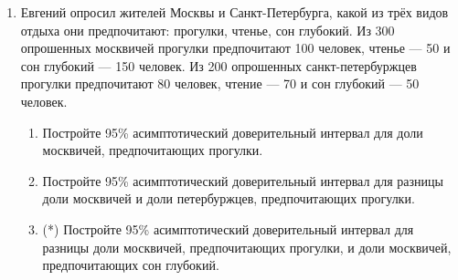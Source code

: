 \documentclass[12pt]{article} %
\begin{document}
\begin{enumerate}
\item Евгений опросил жителей Москвы и Санкт-Петербурга,
какой из трёх видов отдыха они предпочитают: прогулки, чтенье, сон глубокий. 
Из 300 опрошенных москвичей прогулки предпочитают 100 человек, чтенье — 50 и сон глубокий — 150 человек.
Из 200 опрошенных санкт-петербуржцев прогулки предпочитают 80 человек, чтение — 70 и сон глубокий — 50 человек. 

\begin{enumerate}
    \item Постройте 95\% асимптотический доверительный интервал для доли москвичей, предпочитающих прогулки. 
    \item Постройте 95\% асимптотический доверительный интервал для разницы  доли москвичей и доли петербуржцев, предпочитающих прогулки.
    \item (*) Постройте 95\% асимптотический доверительный интервал для разницы  доли москвичей, предпочитающих прогулки, и 
    доли москвичей, предпочитающих сон глубокий. 
\end{enumerate}


\end{enumerate}
\end{document}
